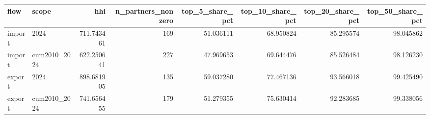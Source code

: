 \begin{tabular}{llrrrrrr}
\toprule
flow & scope & hhi & n_partners_nonzero & top_5_share_pct & top_10_share_pct & top_20_share_pct & top_50_share_pct \\
\midrule
import & 2024 & 711.743461 & 169 & 51.036111 & 68.950824 & 85.295574 & 98.045862 \\
import & cum2010\_2024 & 622.250641 & 227 & 47.969653 & 69.644476 & 85.526484 & 98.126230 \\
export & 2024 & 898.681905 & 135 & 59.037280 & 77.467136 & 93.566018 & 99.425490 \\
export & cum2010\_2024 & 741.656455 & 179 & 51.279355 & 75.630414 & 92.283685 & 99.338056 \\
\bottomrule
\end{tabular}
